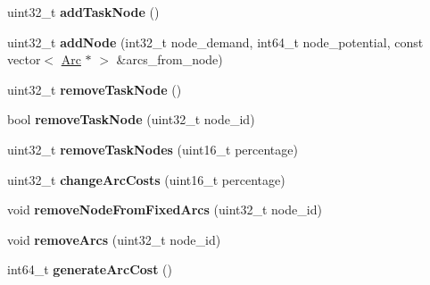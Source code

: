 \begin{DoxyCompactItemize}
\item 
\hypertarget{classflowlessly_1_1Graph_ae0188e508ea5ecf9b11600f75b1db8b6}{uint32\-\_\-t {\bfseries add\-Task\-Node} ()}\label{classflowlessly_1_1Graph_ae0188e508ea5ecf9b11600f75b1db8b6}

\item 
\hypertarget{classflowlessly_1_1Graph_ab8c5af13f9568692a8ab000371ff91c9}{uint32\-\_\-t {\bfseries add\-Node} (int32\-\_\-t node\-\_\-demand, int64\-\_\-t node\-\_\-potential, const vector$<$ \hyperlink{classflowlessly_1_1Arc}{\-Arc} $\ast$ $>$ \&arcs\-\_\-from\-\_\-node)}\label{classflowlessly_1_1Graph_ab8c5af13f9568692a8ab000371ff91c9}

\item 
\hypertarget{classflowlessly_1_1Graph_aa1edd4831228dac2e4da8a4d9aadcb04}{uint32\-\_\-t {\bfseries remove\-Task\-Node} ()}\label{classflowlessly_1_1Graph_aa1edd4831228dac2e4da8a4d9aadcb04}

\item 
\hypertarget{classflowlessly_1_1Graph_a1faca558ebb7f1ee4c2dea2bdbb0bcda}{bool {\bfseries remove\-Task\-Node} (uint32\-\_\-t node\-\_\-id)}\label{classflowlessly_1_1Graph_a1faca558ebb7f1ee4c2dea2bdbb0bcda}

\item 
\hypertarget{classflowlessly_1_1Graph_a3cbad4f3a1533e1e988b8f1c1d3487f2}{uint32\-\_\-t {\bfseries remove\-Task\-Nodes} (uint16\-\_\-t percentage)}\label{classflowlessly_1_1Graph_a3cbad4f3a1533e1e988b8f1c1d3487f2}

\item 
\hypertarget{classflowlessly_1_1Graph_afd41486784423b8befd15cfd731de02e}{uint32\-\_\-t {\bfseries change\-Arc\-Costs} (uint16\-\_\-t percentage)}\label{classflowlessly_1_1Graph_afd41486784423b8befd15cfd731de02e}

\item 
\hypertarget{classflowlessly_1_1Graph_a4f3e5f3510914513dc7b4df518fe23d2}{void {\bfseries remove\-Node\-From\-Fixed\-Arcs} (uint32\-\_\-t node\-\_\-id)}\label{classflowlessly_1_1Graph_a4f3e5f3510914513dc7b4df518fe23d2}

\item 
\hypertarget{classflowlessly_1_1Graph_a9fccb6382a338b6edf268d62abe5f2f2}{void {\bfseries remove\-Arcs} (uint32\-\_\-t node\-\_\-id)}\label{classflowlessly_1_1Graph_a9fccb6382a338b6edf268d62abe5f2f2}

\item 
\hypertarget{classflowlessly_1_1Graph_abc9a7c307852aed252865201f27b8515}{int64\-\_\-t {\bfseries generate\-Arc\-Cost} ()}\label{classflowlessly_1_1Graph_abc9a7c307852aed252865201f27b8515}


\end{DoxyCompactItemize}
